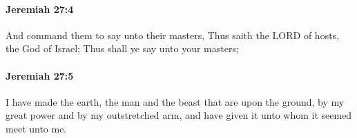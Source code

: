 		\paragraph{Jeremiah 27:4} %
			\label{JEREMIAH-27-4}

			And command them to say unto their masters, Thus saith the LORD of hosts, the God of Israel; Thus shall ye say unto your masters;


		\paragraph{Jeremiah 27:5} %
			\label{JEREMIAH-27-5}

			I have made the earth, the man and the beast that are upon the ground, by my great power and by my outstretched arm, and have given it unto whom it seemed meet unto me.


